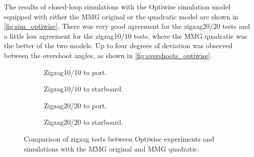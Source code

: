 The results of closed-loop simulations with the Optiwise simulation model equipped with either the MMG original or the quadratic model are shown in \autoref{fig:sim_optiwise}. There was very good agreement for the zigzag20/20 tests and a little less agreement for the zigzag10/10 tests, where the MMG quadratic was the better of the two models. Up to four degrees of deviation was observed between the overshoot angles, as shown in \autoref{fig:overshoots_optiwise}.   
\begin{figure}[h]
     \centering
     \begin{subfigure}[b]{0.40\textwidth}
         \centering
         
        \caption{Zigzag10/10 to port.}
        \label{fig:sim_optiwise_10_port}
     \end{subfigure}
     \hfill
     \begin{subfigure}[b]{0.40\textwidth}
         
        \caption{Zigzag10/10 to starboard.}
        \label{fig:sim_optiwise_10_stbd}
     \end{subfigure}
     \vfill
     \begin{subfigure}[b]{0.40\textwidth}
         \centering
         
        \caption{Zigzag20/20 to port.}
        \label{fig:sim_optiwise_20_port}
     \end{subfigure}
     \hfill
     \begin{subfigure}[b]{0.40\textwidth}
         
        \caption{Zigzag20/20 to starboard.}
        \label{fig:sim_optiwise_20_stbd}
     \end{subfigure}
     
        \caption{Comparison of zigzag tests between Optiwise experiments and simulations with the MMG original and MMG quadratic.}
        \label{fig:sim_optiwise}
\end{figure}
\vspace{-1cm}

